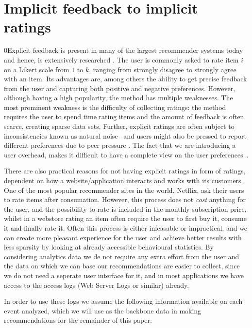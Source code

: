 
\label{implicit-feedback}
\section{Implicit feedback to implicit ratings}
\label{sec:implicit}

0Explicit feedback is present in many of the largest recommender systems today
and hence, is extensively researched \cite{Adomavicius2005}. The user is
commonly asked to rate item $i$ on a Likert scale from $1$ to $k$, ranging from
strongly disagree to strongly agree with an item. Its advantages are, among
others the ability to get precise feedback from the user and capturing both
positive and negative preferences. However, although having a high popularity,
the method has multiple weaknesses. The most prominent weakness is the
difficulty of collecting ratings: the method requires the user to spend time
rating items and the amount of feedback is often scarce, creating sparse data
sets. Further, explicit ratings are often subject to inconsistencies known as
natural noise~\cite{amatriain2009like} and users might also be pressed to
report different preferences due to peer pressure \cite{bell2007scalable}. The
fact that we are introducing a user overhead, makes it difficult to have a
complete view on the user preferences~\cite{Jawaheer2010}.

There are also practical reasons for not having explicit ratings in form of
ratings, dependent on how a website/application interacts and works with its
customers. One of the most popular recommender sites in the world, Netflix, ask
their users to rate items after consumation. However, this process does not
\textit{cost} anything for the user, and the possibility to rate is included in
the monthly subscription price, whilst in a webstore rating an item often
require the user to first buy it, consume it and finally rate it. Often this
process is either infeasable or impractical, and we can create more pleasant
experience for the user and achieve better results with less sparsity by
looking at already accessible behavioural statistics. By considering analytics
data we de not require any extra effort from the user and the data on which we
can base our recommendations are easier to collect, since we do not need a
seperate user interface for it, and in most applications we have access to the
access logs (Web Server Logs or similar) already.

In order to use these logs we assume the following information available on
each event analyzed, which we will use as the backbone data in making
recommendations for the remainder of this paper:

